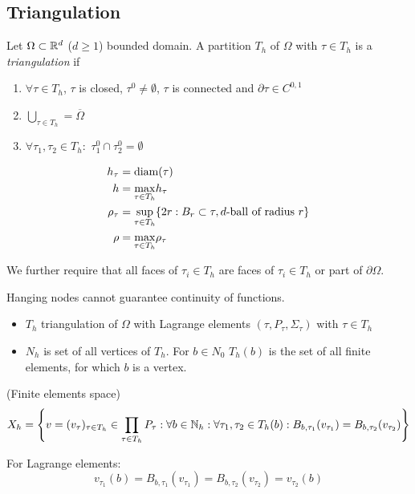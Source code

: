 \subsection{Triangulation}


\begin{definition_}
	Let $\Omega \subset \mathbb{R}^d$ ($d \geq 1$) bounded domain. A partition $T_h$ of $\Omega$ with $\tau \in T_h$ is a \textit{triangulation} if
	\begin{enumerate}[label=\alph*)]
		\item $\forall \tau \in T_h$, $\tau$ is closed, $\tau^0 \neq \emptyset$, $\tau$ is connected and $\partial \tau \in C^{0,1}$
				
		\item $\bigcup \limits_{\tau \in T_h} = \overline{\Omega}$
		
		\item $\forall \tau_1,\tau_2 \in T_h:$ $\tau^0_1\cap \tau^0_2 = \emptyset$
	\end{enumerate}

	\begin{align*}
		h_{\tau} &= \text{diam} (\tau)\\
		h &= \underset{\tau \in T_h}{\max} h_{\tau}\\
		\rho_{\tau} &= \underset{\tau \in T_h}{\sup} \{2r: B_r \subset \tau, d\text{-ball of radius  }r \} \\
		\rho &= \underset{\tau \in T_h}{\max} \rho_{\tau}
	\end{align*}
\end{definition_}

We further require that all faces of $\tau_i \in T_h$ are faces of $\tau_i \in T_h$ or part of $\partial \Omega$.

Hanging nodes cannot guarantee continuity of functions.

\begin{itemize}
	\item $T_h$ triangulation of $\Omega$ with Lagrange elements $(\tau,P_\tau,\Sigma_\tau)$ with $\tau \in T_h$
	\item  $N_h$ is set of all vertices of $T_h$. For $b\in N_0 $ $T_h(b) $ is the set of all finite elements, for which $b$ is a vertex.
\end{itemize}

\begin{definition_}
	(Finite elements space)\\
	\begin{equation*}
		X_h = \left \{ v = (v_\tau)_{\tau \in T_h} \in \prod \limits_{\tau \in T_h} P_\tau :  \forall b  \in\mathbb{N}_h : \forall \tau_1,\tau_2 \in T_h(b): B_{b,\tau_1}(v_{\tau_1}) = B_{b,\tau_2}(v_{\tau_2})  \right \}
	\end{equation*}
\end{definition_}
For Lagrange elements:
\begin{equation*}
	v_{\tau_1}(b) = B_{b,\tau_1}(v_{\tau_1}) = B_{b,\tau_2}(v_{\tau_2}) = v_{\tau_2}(b)
\end{equation*}

